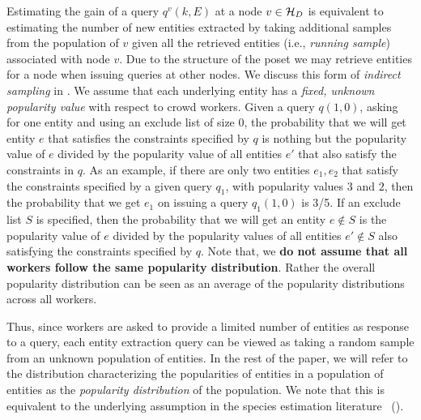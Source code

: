 Estimating the gain of a query $q^v(k,E)$ at a node $v \in \mathcal{H}_D$ is equivalent to estimating the number of new entities extracted by taking additional samples from the population of $v$ given all the retrieved entities (i.e., {\em running sample}) associated with node $v$. Due to the structure of the poset we may retrieve entities for a node when issuing queries at other nodes. We discuss this form of {\em indirect sampling} in . 
\fi
\iftr
{} We assume that each underlying entity has a {\em fixed, unknown popularity value} with respect to crowd workers. Given a query $q(1, 0)$, asking for one entity and using an exclude list of size $0$, the probability that we will get entity $e$ that satisfies the constraints specified by $q$ is nothing but the popularity value of $e$ divided by the popularity value of all entities $e'$ that also satisfy the constraints in $q$. As an example, if there are only two entities $e_1, e_2$ that satisfy the constraints specified by a given query $q_1$, with popularity values $3$ and $2$,
then the probability that we get $e_1$ on issuing a query $q_1(1, 0)$ is 3/5. 
If an exclude list $S$ is specified, then the probability that we will get an entity $e \notin S$ is the popularity value of $e$ divided by the popularity values of all entities $e' \notin S$ also satisfying the constraints specified by $q$. Note that, we {\bf do not assume that all workers follow the same popularity distribution}. Rather the overall popularity distribution can be seen as an average of the popularity distributions across all workers.

Thus, since workers are asked to provide a limited number of entities as response to a query, each entity extraction query can be viewed as taking a random sample from an unknown population of entities. In the rest of the paper, we will refer to the distribution characterizing the popularities of entities in a population of entities as the {\em popularity distribution} of the population. We note that this is equivalent to the underlying assumption in the species estimation literature~\cite{chao:1992} ().


